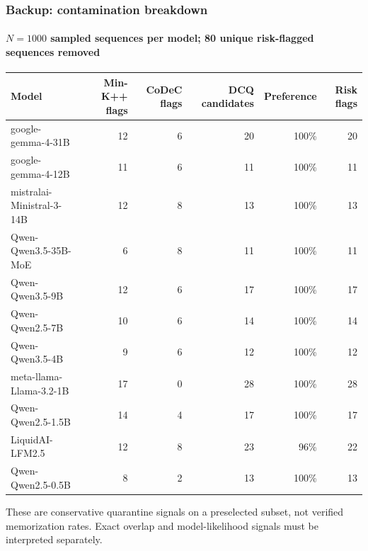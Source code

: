 \documentclass[aspectratio=169,11pt]{beamer}
\begin{document}
\begin{frame}
  \frametitle{Backup: contamination breakdown}
  \framesubtitle{$N=1000$ sampled sequences per model; 80 unique risk-flagged sequences removed}

  \vspace{0.3em}
  \begin{center}
  \renewcommand{\arraystretch}{1.08}
  \scriptsize
  \begin{tabular}{lrrrrr}
    \toprule
    \textbf{Model} & \textbf{Min-K++ flags} & \textbf{CoDeC flags} &
    \textbf{DCQ candidates} & \textbf{Preference} & \textbf{Risk flags} \\
    \midrule
    google-gemma-4-31B        & 12 & 6 & 20 & 100\% & 20 \\
    google-gemma-4-12B        & 11 & 6 & 11 & 100\% & 11 \\
    mistralai-Ministral-3-14B & 12 & 8 & 13 & 100\% & 13 \\
    Qwen-Qwen3.5-35B-MoE      & \phantom{0}6 & 8 & 11 & 100\% & 11 \\
    Qwen-Qwen3.5-9B           & 12 & 6 & 17 & 100\% & 17 \\
    Qwen-Qwen2.5-7B           & 10 & 6 & 14 & 100\% & 14 \\
    Qwen-Qwen3.5-4B           & \phantom{0}9 & 6 & 12 & 100\% & 12 \\
    meta-llama-Llama-3.2-1B   & 17 & 0 & 28 & 100\% & 28 \\
    Qwen-Qwen2.5-1.5B         & 14 & 4 & 17 & 100\% & 17 \\
    LiquidAI-LFM2.5           & 12 & 8 & 23 & \phantom{0}96\% & 22 \\
    Qwen-Qwen2.5-0.5B         & \phantom{0}8 & 2 & 13 & 100\% & 13 \\
    \bottomrule
  \end{tabular}
  \end{center}

  \vspace{0.5em}
  \small These are conservative quarantine signals on a preselected subset, not verified
  memorization rates. Exact overlap and model-likelihood signals must be interpreted separately.
\end{frame}
\end{document}
